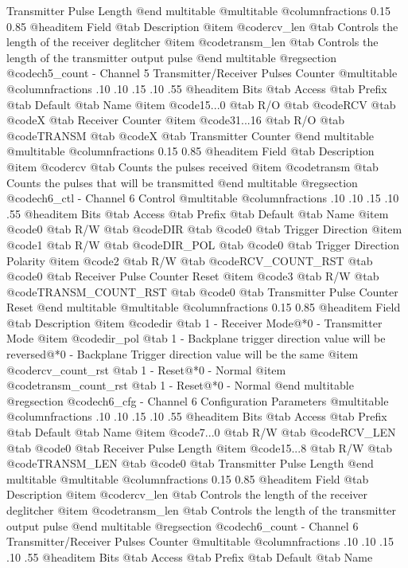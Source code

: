 Transmitter Pulse Length
@end multitable
@multitable @columnfractions 0.15 0.85
@headitem Field @tab Description
@item @code{rcv_len} @tab Controls the length of the receiver deglitcher
@item @code{transm_len} @tab Controls the length of the transmitter output pulse
@end multitable
@regsection @code{ch5_count} - Channel 5 Transmitter/Receiver Pulses Counter
@multitable @columnfractions .10 .10 .15 .10 .55
@headitem Bits @tab Access @tab Prefix @tab Default @tab Name
@item @code{15...0}
@tab R/O @tab
@code{RCV}
@tab @code{X} @tab 
Receiver Counter
@item @code{31...16}
@tab R/O @tab
@code{TRANSM}
@tab @code{X} @tab 
Transmitter Counter
@end multitable
@multitable @columnfractions 0.15 0.85
@headitem Field @tab Description
@item @code{rcv} @tab Counts the pulses received
@item @code{transm} @tab Counts the pulses that will be transmitted
@end multitable
@regsection @code{ch6_ctl} - Channel 6 Control
@multitable @columnfractions .10 .10 .15 .10 .55
@headitem Bits @tab Access @tab Prefix @tab Default @tab Name
@item @code{0}
@tab R/W @tab
@code{DIR}
@tab @code{0} @tab 
Trigger Direction
@item @code{1}
@tab R/W @tab
@code{DIR_POL}
@tab @code{0} @tab 
Trigger Direction Polarity
@item @code{2}
@tab R/W @tab
@code{RCV_COUNT_RST}
@tab @code{0} @tab 
Receiver Pulse Counter Reset
@item @code{3}
@tab R/W @tab
@code{TRANSM_COUNT_RST}
@tab @code{0} @tab 
Transmitter Pulse Counter Reset
@end multitable
@multitable @columnfractions 0.15 0.85
@headitem Field @tab Description
@item @code{dir} @tab 1 - Receiver Mode@*0 - Transmitter Mode
@item @code{dir_pol} @tab 1 - Backplane trigger direction value will be reversed@*0 - Backplane Trigger direction value will be the same
@item @code{rcv_count_rst} @tab 1 - Reset@*0 - Normal
@item @code{transm_count_rst} @tab 1 - Reset@*0 - Normal
@end multitable
@regsection @code{ch6_cfg} - Channel 6 Configuration Parameters
@multitable @columnfractions .10 .10 .15 .10 .55
@headitem Bits @tab Access @tab Prefix @tab Default @tab Name
@item @code{7...0}
@tab R/W @tab
@code{RCV_LEN}
@tab @code{0} @tab 
Receiver Pulse Length
@item @code{15...8}
@tab R/W @tab
@code{TRANSM_LEN}
@tab @code{0} @tab 
Transmitter Pulse Length
@end multitable
@multitable @columnfractions 0.15 0.85
@headitem Field @tab Description
@item @code{rcv_len} @tab Controls the length of the receiver deglitcher
@item @code{transm_len} @tab Controls the length of the transmitter output pulse
@end multitable
@regsection @code{ch6_count} - Channel 6 Transmitter/Receiver Pulses Counter
@multitable @columnfractions .10 .10 .15 .10 .55
@headitem Bits @tab Access @tab Prefix @tab Default @tab Name

